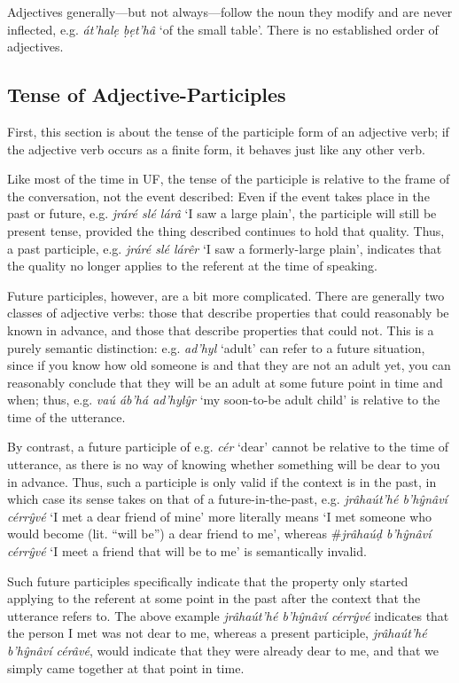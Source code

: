 \documentclass[a4paper, 12pt, twoside, openright, final]{book}
\let \w \textit
\begin{document}
Adjectives generally—but not always—follow the noun they modify and are never inflected, e.g. \w{át’halẹ ḅẹt’hâ} ‘of the small table’.
There is no established order of adjectives.

\subsection{Tense of Adjective-Participles}
First, this section is about the tense of the participle form of an adjective verb; if the adjective verb occurs as a
finite form, it behaves just like any other verb.

Like most of the time in UF, the tense of the participle is relative to the frame of the conversation, not
the event described: Even if the event takes place in the past or future, e.g. \w{jráré slé lárâ} ‘I saw a large plain’,
the participle will still be present tense, provided the thing described continues to hold that quality. Thus, a past
participle, e.g. \w{jráré slé lárêr} ‘I saw a formerly-large plain’, indicates that the quality no longer applies to
the referent at the time of speaking.

Future participles, however, are a bit more complicated. There are generally two classes of adjective verbs: those that
describe properties that
could reasonably be known in advance, and those that describe properties that could not. This is a purely semantic distinction: e.g. \w{ad’hyl}
‘adult’ can refer to a future situation, since if you know how old someone is and that they are not an adult yet, you
can reasonably conclude that they will be an adult at some future point in time and when; thus, e.g. \w{vaú áb’há ad’hylŷr}
‘my soon-to-be adult child’ is relative to the time of the utterance.

By contrast, a future participle of e.g. \w{cér} ‘dear’ cannot be relative to the time of utterance, as there is no way of
knowing whether something will be dear to you in advance. Thus, such a participle is only valid if the context is in
the past, in which case its sense takes on that of a future-in-the-past, e.g. \w{jrâhaút’hé b’hŷnâví cérrŷvé} ‘I met a dear
friend of mine’ more literally means ‘I met someone who would become (lit. “will be”) a dear friend to me’, whereas
\#\w{jrâhaúḍ b’hŷnâví cérrŷvé} ‘I meet a friend that will be to me’ is semantically invalid.

Such future participles specifically indicate that the property only started applying to the referent at some point in the
past after the context that the utterance refers to. The above example \w{jrâhaút’hé b’hŷnâví cérrŷvé} indicates that the
person I met was not dear to me, whereas a present participle, \w{jrâhaút’hé b’hŷnâví cérâvé}, would indicate that
they were already dear to me, and that we simply came together at that point in time.
\end{document}
